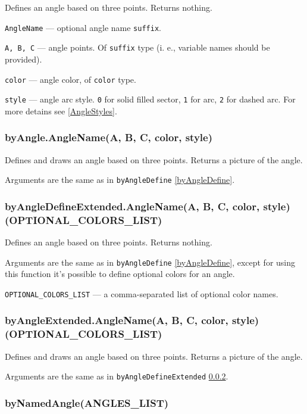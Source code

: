 \documentclass{ltxdoc}
\begin{document}
	Defines an angle based on three points. Returns nothing.

	\texttt{AngleName} — optional angle name \texttt{suffix}.
		
	\texttt{A, B, C} — angle points. Of \texttt{suffix} type (i. e., variable names should be provided).
	
	\texttt{color} — angle color, of \texttt{color} type.
	
	\texttt{style} — angle arc style. \texttt{0} for solid filled sector, \texttt{1} for arc, \texttt{2} for dashed arc. For more detains see \ref{AngleStyles}.


\subsubsection{byAngle.AngleName(A, B, C, color, style)}\label{byAngle}

	Defines and draws an angle based on three points. Returns a picture of the angle.
	
	Arguments are the same as in \texttt{byAngleDefine} \ref{byAngleDefine}.

\subsubsection{byAngleDefineExtended.AngleName(A, B, C, color, style)(OPTIONAL\_COLORS\_LIST)}\label{byAngleDefineExtended}

	Defines an angle based on three points. Returns nothing.
	
	Arguments are the same as in \texttt{byAngleDefine} \ref{byAngleDefine}, except for using this function it's possible to define optional colors for an angle.
	
	\texttt{OPTIONAL\_COLORS\_LIST} — a comma-separated list of optional color names.
	
\subsubsection{byAngleExtended.AngleName(A, B, C, color, style)(OPTIONAL\_COLORS\_LIST)}\label{byAngleExtended}

	Defines and draws an angle based on three points. Returns a picture of the angle.
	
	Arguments are the same as in \texttt{byAngleDefineExtended} \ref{byAngleDefineExtended}.

\subsubsection{byNamedAngle(ANGLES\_LIST)}\label{byNamedAngle}
	
\end{document}
